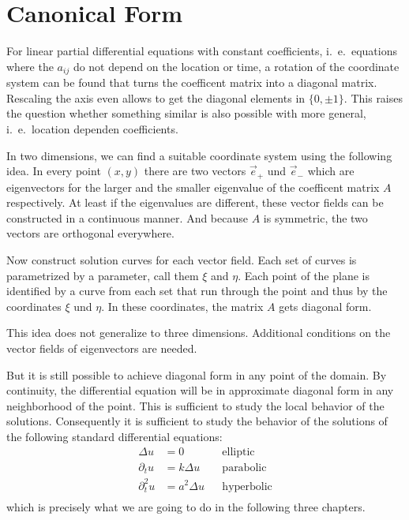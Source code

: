 %
%
%
\section{Canonical Form}
For linear partial differential equations with constant coefficients,
i.~e.~equations where the $a_{ij}$ do not depend on the location or time,
a rotation of the coordinate system can be found that turns the coefficent
matrix into a diagonal matrix.
Rescaling the axis even allows to get the diagonal elements in $\{0,\pm1\}$.
This raises the question whether something similar is also possible with
more general, i.~e.~location dependen coefficients.

In two dimensions, we can find a suitable coordinate system using the
following idea.
In every point $(x,y)$ there are two vectors $\vec e_+$ und $\vec e_-$
which are eigenvectors for the larger and the smaller eigenvalue of the
coefficent matrix $A$ respectively.
At least if the eigenvalues are different, these vector fields can be
constructed in a continuous manner.
And because $A$ is symmetric, the two vectors are orthogonal everywhere.

Now construct solution curves for each vector field.
Each set of curves is parametrized by a parameter, call them $\xi$ and $\eta$.
Each point of the plane is identified by a curve from each set that
run through the point and thus by the coordinates $\xi$ und $\eta$.
In these coordinates, the matrix $A$ gets diagonal form.

This idea does not generalize to three dimensions.
Additional conditions on the vector fields of eigenvectors are needed.

But it is still possible to achieve diagonal form in any point of the
domain.
By continuity, the differential equation will be in approximate diagonal
form in any neighborhood of the point.
This is sufficient to study the local behavior of the solutions.
Consequently it is sufficient to study the behavior of the solutions
of the following standard differential equations:
\begin{align*}
\Delta u&=0&&\text{elliptic}\\
\partial_tu&=k\Delta u&&\text{parabolic}\\
\partial_t^2u&=a^2\Delta u&&\text{hyperbolic}\\
\end{align*}
which is precisely what we are going to do in the following three chapters.

